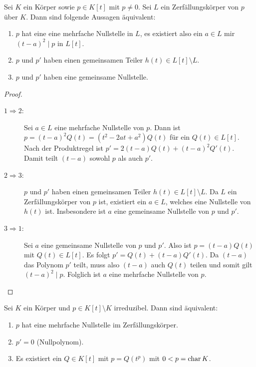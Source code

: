 \documentclass[12pt,a4paper]{scrartcl}
\begin{document}
\begin{satz} \label{thm:18.3}
	Sei $K$ ein Körper sowie $p\in K[t]$ mit $p\neq 0$. Sei $L$ ein Zerfällungskörper von $p$ über $K$. Dann sind folgende Aussagen äquivalent:
	\begin{enumerate}
		\item $p$ hat eine eine mehrfache Nullstelle in $L$, es existiert also ein $a\in L$ mir $(t-a)^2\mid p$ in $L[t]$.
		\item $p$ und $p'$ haben einen gemeinsamen Teiler $h(t)\in L[t]\setminus L$.
		\item $p$ und $p'$ haben eine gemeinsame Nullstelle.
	\end{enumerate}
\end{satz}
\begin{proof}
	\leavevmode
	\begin{description}
		\item[\glqq$1\Rightarrow 2$\grqq:] Sei $a\in L$ eine mehrfache Nullstelle von $p$. Dann ist $p = (t-a)^2Q(t) = (t^2-2at+a^2)Q(t)$ für ein $Q(t)\in L[t]$. Nach der Produktregel ist $p' = 2(t-a)Q(t) + (t-a)^2Q'(t)$. Damit teilt $(t-a)$ sowohl $p$ als auch $p'$.
		\item[\glqq$2\Rightarrow 3$\grqq:] $p$ und $p'$ haben einen gemeinsamen Teiler $h(t)\in L[t]\setminus L$. Da $L$ ein Zerfällungskörper von $p$ ist, existiert ein $a\in L$, welches eine Nullstelle von $h(t)$ ist. Insbesondere ist $a$ eine gemeinsame Nullstelle von $p$ und $p'$.
		\item[\glqq$3\Rightarrow 1$\grqq:] Sei $a$ eine gemeinsame Nullstelle von $p$ und $p'$. Also ist $p = (t-a)Q(t)$ mit $Q(t)\in L[t]$. Es folgt $p' = Q(t) + (t-a)Q'(t)$. Da $(t-a)$ das Polynom $p'$ teilt, muss also $(t-a)$ auch $Q(t)$ teilen und somit gilt $(t-a)^2\mid p$. Folglich ist $a$ eine mehrfache Nullstelle von $p$.
	\end{description}
\end{proof}
\begin{kor}
	Sei $K$ ein Körper und $p\in K[t]\setminus K$ irreduzibel. Dann sind äquivalent:
	\begin{enumerate}
		\item $p$ hat eine mehrfache Nullstelle im Zerfällungskörper.
		\item $p' = 0$ (Nullpolynom).
		\item Es existiert ein $Q\in K[t]$ mit $p = Q(t^p)$ mit $0<p = \operatorname{char} K$.
	\end{enumerate}
\end{kor}
\end{document}
